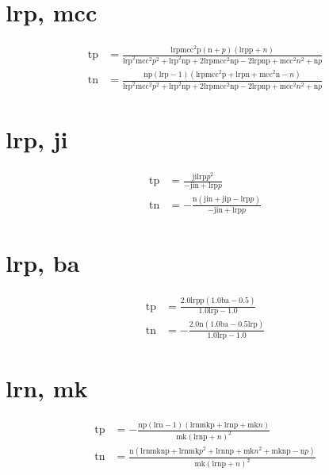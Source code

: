 \documentclass[3p,times]{elsarticle}
\begin{document}
\begin{footnotesize}
\begin{landscape}
\section{lrp, mcc}
\begin{align}
\mathrm{tp} &= \frac{\mathrm{lrp} \mathrm{mcc}^{2} \mathrm{p} \left(\mathrm{n} + p\right) \left(\mathrm{lrp} \mathrm{p} + n\right)}{\mathrm{lrp}^{2} \mathrm{mcc}^{2} p^{2} + \mathrm{lrp}^{2} \mathrm{n} \mathrm{p} + 2 \mathrm{lrp} \mathrm{mcc}^{2} \mathrm{n} \mathrm{p} - 2 \mathrm{lrp} \mathrm{n} \mathrm{p} + \mathrm{mcc}^{2} n^{2} + \mathrm{n} p}\\
\mathrm{tn} &= \frac{\mathrm{n} \mathrm{p} \left(\mathrm{lrp} - 1\right) \left(\mathrm{lrp} \mathrm{mcc}^{2} \mathrm{p} + \mathrm{lrp} \mathrm{n} + \mathrm{mcc}^{2} \mathrm{n} - n\right)}{\mathrm{lrp}^{2} \mathrm{mcc}^{2} p^{2} + \mathrm{lrp}^{2} \mathrm{n} \mathrm{p} + 2 \mathrm{lrp} \mathrm{mcc}^{2} \mathrm{n} \mathrm{p} - 2 \mathrm{lrp} \mathrm{n} \mathrm{p} + \mathrm{mcc}^{2} n^{2} + \mathrm{n} p}
\end{align}
\section{lrp, ji}
\begin{align}
\mathrm{tp} &= \frac{\mathrm{ji} \mathrm{lrp} p^{2}}{- \mathrm{ji} \mathrm{n} + \mathrm{lrp} p}\\
\mathrm{tn} &= - \frac{\mathrm{n} \left(\mathrm{ji} \mathrm{n} + \mathrm{ji} \mathrm{p} - \mathrm{lrp} p\right)}{- \mathrm{ji} \mathrm{n} + \mathrm{lrp} p}
\end{align}
\section{lrp, ba}
\begin{align}
\mathrm{tp} &= \frac{2.0 \mathrm{lrp} \mathrm{p} \left(1.0 \mathrm{ba} - 0.5\right)}{1.0 \mathrm{lrp} - 1.0}\\
\mathrm{tn} &= - \frac{2.0 \mathrm{n} \left(1.0 \mathrm{ba} - 0.5 \mathrm{lrp}\right)}{1.0 \mathrm{lrp} - 1.0}
\end{align}
\section{lrn, mk}
\begin{align}
\mathrm{tp} &= - \frac{\mathrm{n} \mathrm{p} \left(\mathrm{lrn} - 1\right) \left(\mathrm{lrn} \mathrm{mk} \mathrm{p} + \mathrm{lrn} \mathrm{p} + \mathrm{mk} n\right)}{\mathrm{mk} \left(\mathrm{lrn} \mathrm{p} + n\right)^{2}}\\
\mathrm{tn} &= \frac{\mathrm{n} \left(\mathrm{lrn} \mathrm{mk} \mathrm{n} \mathrm{p} + \mathrm{lrn} \mathrm{mk} p^{2} + \mathrm{lrn} \mathrm{n} \mathrm{p} + \mathrm{mk} n^{2} + \mathrm{mk} \mathrm{n} \mathrm{p} - \mathrm{n} p\right)}{\mathrm{mk} \left(\mathrm{lrn} \mathrm{p} + n\right)^{2}}
\end{align}

\end{landscape}
\end{footnotesize}
\end{document}
